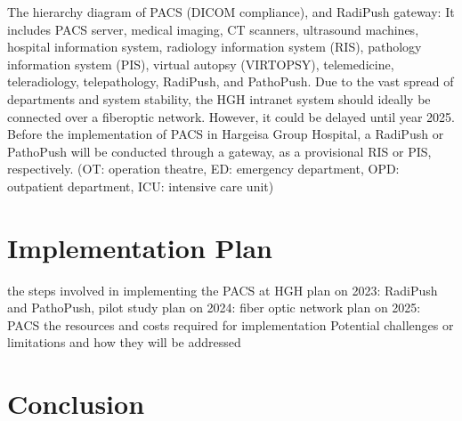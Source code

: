 \documentclass{article}
\begin{document}

The hierarchy diagram of PACS (DICOM compliance), and RadiPush gateway: It includes PACS server, medical imaging, CT scanners, ultrasound machines, hospital information system, radiology information system (RIS), pathology information system (PIS), virtual autopsy (VIRTOPSY), telemedicine, teleradiology, telepathology, RadiPush, and PathoPush.
Due to the vast spread of departments and system stability, the HGH intranet system should ideally be connected over a fiberoptic network.
However, it could be delayed until year 2025.
Before the implementation of PACS in Hargeisa Group Hospital, a RadiPush or PathoPush will be conducted through a gateway, as a provisional RIS or PIS, respectively.
(OT: operation theatre, ED: emergency department, OPD: outpatient department, ICU: intensive care unit)
\clearpage

\section{Implementation Plan}
\begin{outline}
    \1 the steps involved in implementing the PACS at HGH
        \2 plan on 2023: RadiPush and PathoPush, pilot study
        \2 plan on 2024: fiber optic network
        \2 plan on 2025: PACS
    \1 the resources and costs required for implementation
    \1 Potential challenges or limitations and how they will be addressed
\end{outline}

\section{Conclusion}

\end{document}
